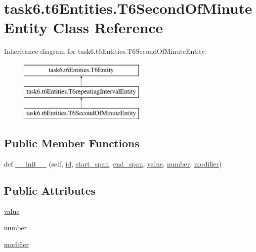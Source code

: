 \hypertarget{classtask6_1_1t6Entities_1_1T6SecondOfMinuteEntity}{}\section{task6.\+t6\+Entities.\+T6\+Second\+Of\+Minute\+Entity Class Reference}
\label{classtask6_1_1t6Entities_1_1T6SecondOfMinuteEntity}
Inheritance diagram for task6.\+t6\+Entities.\+T6\+Second\+Of\+Minute\+Entity\+:\begin{figure}[H]
\begin{center}
\leavevmode
\includegraphics[height=3.000000cm]{classtask6_1_1t6Entities_1_1T6SecondOfMinuteEntity}
\end{center}
\end{figure}
\subsection*{Public Member Functions}
\begin{DoxyCompactItemize}
\item 
def \hyperlink{classtask6_1_1t6Entities_1_1T6SecondOfMinuteEntity_a3523b619b18a5e697d9cb943d16cf482}{\+\_\+\+\_\+init\+\_\+\+\_\+} (self, \hyperlink{classtask6_1_1t6Entities_1_1T6Entity_afeeced8134bb3ebe0cfecc64d0ab46a4}{id}, \hyperlink{classtask6_1_1t6Entities_1_1T6Entity_a52779e9af8864dc98e8b02fc5b9b041a}{start\+\_\+span}, \hyperlink{classtask6_1_1t6Entities_1_1T6Entity_aeb402200b156cd9562c5111dfe777b98}{end\+\_\+span}, \hyperlink{classtask6_1_1t6Entities_1_1T6SecondOfMinuteEntity_a953e8f418d52f6d7086b15bcc9c09b45}{value}, \hyperlink{classtask6_1_1t6Entities_1_1T6SecondOfMinuteEntity_a9a7d83f3f2e73db26b4471180b862fa0}{number}, \hyperlink{classtask6_1_1t6Entities_1_1T6SecondOfMinuteEntity_a611814e0a295d6a80e296f1ea02e10c4}{modifier})
\end{DoxyCompactItemize}
\subsection*{Public Attributes}
\begin{DoxyCompactItemize}
\item 
\hyperlink{classtask6_1_1t6Entities_1_1T6SecondOfMinuteEntity_a953e8f418d52f6d7086b15bcc9c09b45}{value}
\item 
\hyperlink{classtask6_1_1t6Entities_1_1T6SecondOfMinuteEntity_a9a7d83f3f2e73db26b4471180b862fa0}{number}
\item 
\hyperlink{classtask6_1_1t6Entities_1_1T6SecondOfMinuteEntity_a611814e0a295d6a80e296f1ea02e10c4}{modifier}
\end{DoxyCompactItemize}



